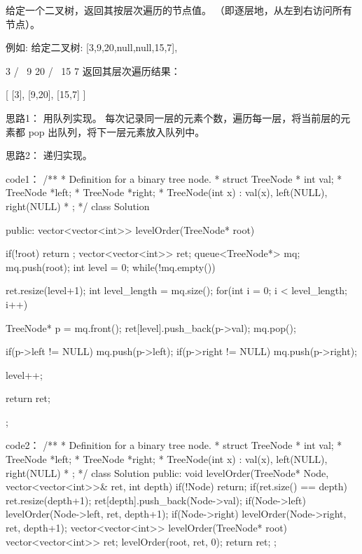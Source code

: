 给定一个二叉树，返回其按层次遍历的节点值。 （即逐层地，从左到右访问所有节点）。

例如:
给定二叉树: [3,9,20,null,null,15,7],

    3
   / \
  9  20
    /  \
   15   7
返回其层次遍历结果：

[
  [3],
  [9,20],
  [15,7]
]

























思路1：
用队列实现。
每次记录同一层的元素个数，遍历每一层，将当前层的元素都 pop 出队列，将下一层元素放入队列中。

思路2：
递归实现。


























code1：
/**
 * Definition for a binary tree node.
 * struct TreeNode {
 *     int val;
 *     TreeNode *left;
 *     TreeNode *right;
 *     TreeNode(int x) : val(x), left(NULL), right(NULL) {}
 * };
 */
class Solution {
public:
    vector<vector<int>> levelOrder(TreeNode* root) {
        if(!root) return {};
        vector<vector<int>> ret;
        queue<TreeNode*> mq;
        mq.push(root);
        int level = 0;
        while(!mq.empty())
        {
            ret.resize(level+1);
            int level_length = mq.size();
            for(int i = 0; i < level_length; i++)
            {
                TreeNode* p = mq.front();
                ret[level].push_back(p->val);
                mq.pop();

                if(p->left != NULL) mq.push(p->left);
                if(p->right != NULL) mq.push(p->right);
            }
            level++;
        }
        return ret;
    }
};





code2：
/**
 * Definition for a binary tree node.
 * struct TreeNode {
 *     int val;
 *     TreeNode *left;
 *     TreeNode *right;
 *     TreeNode(int x) : val(x), left(NULL), right(NULL) {}
 * };
 */
class Solution {
public:
    void levelOrder(TreeNode* Node, vector<vector<int>>& ret, int depth)
    {
        if(!Node) return;
        if(ret.size() == depth)
        {
            ret.resize(depth+1);
        }
        ret[depth].push_back(Node->val);
        if(Node->left) levelOrder(Node->left, ret, depth+1);
        if(Node->right) levelOrder(Node->right, ret, depth+1);
    }
    vector<vector<int>> levelOrder(TreeNode* root) {
        vector<vector<int>> ret;
        levelOrder(root, ret, 0);
        return ret;
    }
};